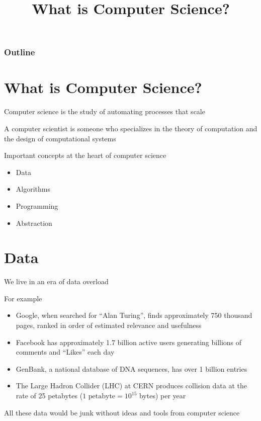 \documentclass[8pt,a4paper,compress]{beamer}
\title{What is Computer Science?}
\date{}
\begin{document}
\begin{frame}
\vfill
\titlepage
\end{frame}

\begin{frame}
\frametitle{Outline}
\tableofcontents
\end{frame}

\section{What is Computer Science?}
\begin{frame}[fragile]
\pause

Computer science is the study of automating processes that scale

\pause
\bigskip

A computer scientist is someone who specializes in the theory of computation and the design of computational systems

\pause
\bigskip

Important concepts at the heart of computer science
\begin{itemize}
\item Data
\item Algorithms
\item Programming
\item Abstraction
\end{itemize}
\end{frame}

\section{Data}
\begin{frame}[fragile]
\pause

We live in an era of data overload

\pause
\bigskip

For example
\begin{itemize}
\item Google, when searched for ``Alan Turing'', finds approximately 750 thousand pages, ranked in order of estimated relevance and usefulness 
\item Facebook has approximately 1.7 billion active users generating billions of comments and ``Likes'' each day 
\item GenBank, a national database of DNA sequences, has over 1 billion entries 
\item The Large Hadron Collider (LHC) at CERN produces collision data at the rate of 25 petabytes ($1 \text{ petabyte} = 10^{15}$ bytes) per year
\end{itemize}

\pause
\bigskip

All these data would be junk without ideas and tools from computer science
\end{frame}
\end{document}

